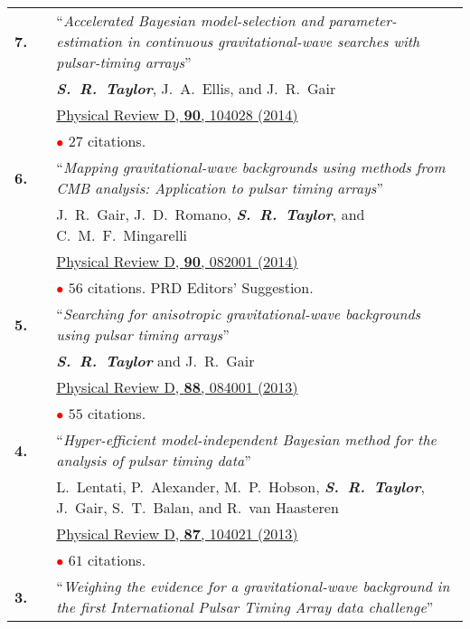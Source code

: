 \documentclass[11pt,letterpaper,sans]{moderncv}
\begin{document}
{\begin{longtable}{rp{0.3cm}p{15.8cm}}
\textbf{7.} & & ``\textit{Accelerated Bayesian model-selection and parameter-estimation in continuous gravitational-wave searches with pulsar-timing arrays}'' \\ 
&& \textit{\textbf{S.~R.~Taylor}}, J.~A.~Ellis, and J.~R.~Gair \\ 
&& \href{http://journals.aps.org/prd/abstract/10.1103/PhysRevD.90.104028}{{\color{color1} Physical Review D, \textbf{90}, 104028 (2014)}} \\
&& \textcolor{red}{$\bullet$} $27$ citations. \vspace{0.09cm}\\
\textbf{6.} & & ``\textit{Mapping gravitational-wave backgrounds using methods from CMB analysis: Application to pulsar timing arrays}'' \\ 
&& J.~R.~Gair, J.~D.~Romano, \textit{\textbf{S.~R.~Taylor}}, and C.~M.~F.~Mingarelli \\ 
&& \href{http://journals.aps.org/prd/abstract/10.1103/PhysRevD.90.082001}{{\color{color1} Physical Review D, \textbf{90}, 082001 (2014)}} \\
&& \textcolor{red}{$\bullet$} $56$ citations. PRD Editors' Suggestion.\vspace{0.09cm}\\
\textbf{5.} & & ``\textit{Searching for anisotropic gravitational-wave backgrounds using pulsar timing arrays}'' \\ 
&& \textit{\textbf{S.~R.~Taylor}} and J.~R.~Gair \\ 
&& \href{http://journals.aps.org/prd/abstract/10.1103/PhysRevD.88.084001}{{\color{color1} Physical Review D, \textbf{88}, 084001 (2013)}} \\
&& \textcolor{red}{$\bullet$} $55$ citations. \vspace{0.09cm}\\
\textbf{4.} & & ``\textit{Hyper-efficient model-independent Bayesian method for the analysis of pulsar timing data}'' \\ 
&& L.~Lentati, P.~Alexander, M.~P.~Hobson, \textit{\textbf{S.~R.~Taylor}}, J.~Gair, S.~T.~Balan, and R.~van Haasteren \\ 
&& \href{http://journals.aps.org/prd/abstract/10.1103/PhysRevD.87.104021}{{\color{color1} Physical Review D, \textbf{87}, 104021 (2013)}} \\
&& \textcolor{red}{$\bullet$} $61$ citations. \vspace{0.09cm}\\
\textbf{3.} & & ``\textit{Weighing the evidence for a gravitational-wave background in the first International Pulsar Timing Array data challenge}'' \\ 

\end{longtable}}
\end{document}
